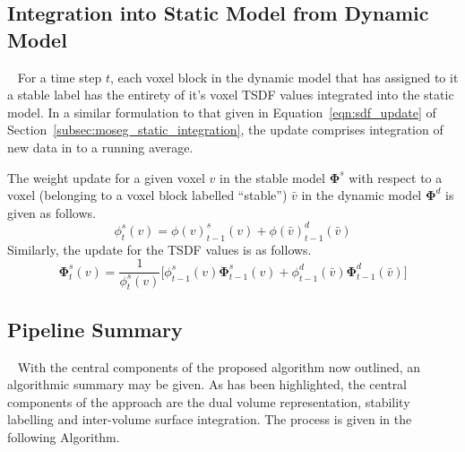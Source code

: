\subsection{Integration into Static Model from Dynamic Model}
~\label{sub:moseg_static_to_dynamic}
For a time step \(t\), each voxel block in the dynamic model that has assigned to
it a stable label has the entirety of it's voxel TSDF values integrated into the
static model. In a similar formulation to that given in Equation~\ref{eqn:sdf_update}
of Section~\ref{subsec:moseg_static_integration}, the update comprises 
integration of new data in to a running average.

The weight update for a given voxel \(v\) in the stable model \(\bm{\Phi}^{s}\)
with respect to a voxel (belonging to a voxel block labelled ``stable'') 
\(\bar{v}\) in the dynamic model \(\bm{\Phi}^{d}\) is given as follows.
\begin{equation}
  \label{eqn:moseg_weight_update}
  \phi^{s}_{t}(v) = \phi{(v)}^{s}_{t-1}(v) + \phi{(\bar{v})}^{d}_{t-1}(\bar{v})
\end{equation}
Similarly, the update for the TSDF values is as follows.
\begin{equation}
  \label{eqn:moseg_sdf_update}
  \bm{\Phi}^{s}_{t}(v) = \frac{1}{\phi^{s}_{t}(v)} \bigg[
  \phi^{s}_{t-1}(v) \bm{\Phi}^{s}_{t-1}(v) +
  \phi^{d}_{t-1}(\bar{v}) \bm{\Phi}^{d}_{t-1}(\bar{v})
  \bigg]
\end{equation}

\subsection{Pipeline Summary}
~\label{subsec:moseg_pipeline_summary}
With the central components of the proposed algorithm now outlined, an algorithmic 
summary may be given. As has been highlighted, the central components of the approach 
are the dual volume representation, stability labelling and inter-volume surface 
integration. The process is given in the following Algorithm.

